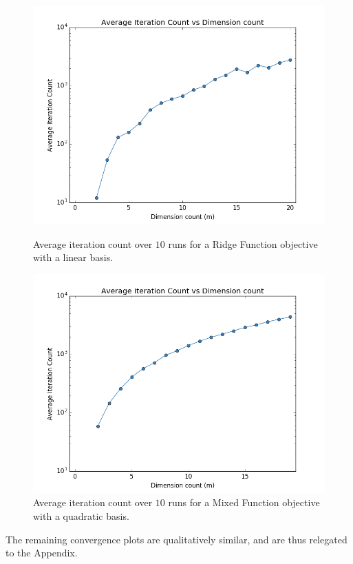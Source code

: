 \documentclass[]{aiaa-tc}%
\begin{document}
\begin{figure}[!ht]
\centering
\begin{minipage}{.50\textwidth}
 \centering
 \includegraphics[width=.8\textwidth]{../images/count_linear_basis_ridge_objective}
 \caption{Average iteration count over $10$ runs for a Ridge Function objective with a linear basis.}
 \label{fig:count_linear_basis_ridge_objective}
\end{minipage}%
\begin{minipage}{.50\textwidth}
 \centering
 \includegraphics[width=.8\textwidth]{../images/count_quadratic_basis_mixed_objective}
 \caption{Average iteration count over $10$ runs for a Mixed Function objective with a quadratic basis.}
 \label{fig:count_quadratic_basis_mixed_objective}
\end{minipage}
\end{figure}

\newpage
The remaining convergence plots are qualitatively similar, and are thus relegated to the Appendix.

\end{document}
